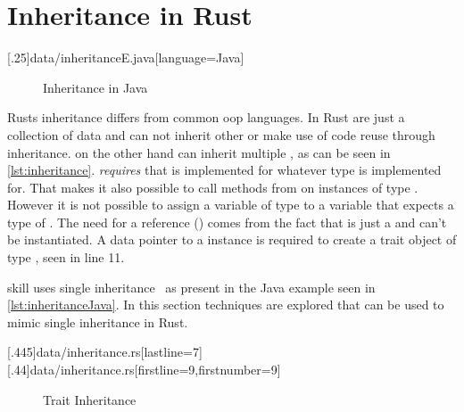 \documentclass[thesis]{subfiles}
\begin{document}
\section{Inheritance in Rust}\label{sec:inheritance}
  \LstTikzBox{\inheritanceJava}[.25\linewidth]{data/inheritanceE.java}[language=Java]
  \begin{wrapfigure}{r}{0.38\textwidth}
    \vspace*{-1.825\baselineskip}%
    \captionsetup{type=lstlisting}
    \begin{center}
      \usebox{\inheritanceJava}
    \end{center}
    \vspace*{-\baselineskip}%
    \caption{Inheritance in Java}\label{lst:inheritanceJava}%
    \vspace*{-\baselineskip}%
  \end{wrapfigure}
  Rusts inheritance differs from common \gls{oop} languages.
  In Rust \structs are just a collection of data and can not inherit other \structs or make use of code reuse through inheritance.
  \traits  on the other hand can inherit multiple \traits, as can be seen in \autoref{lst:inheritance}.
   \emph{requires} that  is implemented for whatever type  is implemented for.
  That makes it also possible to call methods from  on instances of type .
  However it is not possible to assign a variable of type  to a variable that expects a type of .
  The need for a reference (\codr{&}) comes from the fact that  is just a \trait and can't be instantiated.
  A data pointer to a \struct instance is required to create a trait object of type , seen in line 11.

  \gls{skill} uses single inheritance~\autocite{skill-tr} as present in the Java example seen in \autoref{lst:inheritanceJava}.
  In this section techniques are explored that can be used to mimic single inheritance in Rust.

  \LstTikzBox{\inheritanceOne}[.445\linewidth]{data/inheritance.rs}[lastline=7]
  \LstTikzBox{\inheritanceTwo}[.44\linewidth]{data/inheritance.rs}[firstline=9,firstnumber=9]
  \begin{figure}[ht]
    \captionsetup{type=lstlisting}
    \usebox{\inheritanceOne}\hfill
    \usebox{\inheritanceTwo}
    \caption{Trait Inheritance}\label{lst:inheritance}
  \end{figure}
\end{document}
